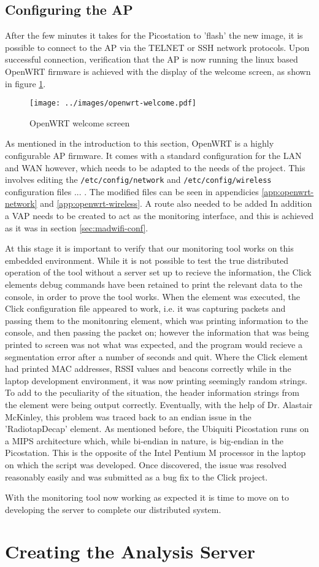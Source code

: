     \subsection{Configuring the AP}
	After the few minutes it takes for the Picostation to 'flash' the new image, it is possible to connect to the AP via the TELNET or SSH network protocols. Upon successful connection, verification that the AP is now running the linux based OpenWRT firmware is achieved with the display of the welcome screen, as shown in figure \ref{fig:openwrt-welcome}.

	\begin{figure}[ht]
	  \centering
	  \texttt{[image: ../images/openwrt-welcome.pdf]}
	  \caption{OpenWRT welcome screen}
	  \label{fig:openwrt-welcome}
	\end{figure}

	As mentioned in the introduction to this section, OpenWRT is a highly configurable AP firmware. It comes with a standard configuration for the LAN and WAN however, which needs to be adapted to the needs of the project. This involves editing the \texttt{/etc/config/network} and \texttt{/etc/config/wireless} configuration files ... . The modified files can be seen in appendicies \ref{app:openwrt-network} and \ref{app:openwrt-wireless}. A route also needed to be added  In addition a VAP needs to be created to act as the monitoring interface, and this is achieved as it was in section \ref{sec:madwifi-conf}.
    
	At this stage it is important to verify that our monitoring tool works on this embedded environment. While it is not possible to test the true distributed operation of the tool without a server set up to recieve the information, the Click elements debug commands have been retained to print the relevant data to the console, in order to prove the tool works. When the element was executed, the Click configuration file appeared to work, i.e. it was capturing packets and passing them to the monitonring element, which was printing information to the console, and then passing the packet on; however the information that was being printed to screen was not what was expected, and the program would recieve a segmentation error after a number of seconds and quit. Where the Click element had printed MAC addresses, RSSI values and beacons correctly while in the laptop development environment, it was now printing seemingly random strings. To add to the peculiarity of the situation, the header information strings from the element were being output correctly. Eventually, with the help of Dr. Alastair McKinley, this problem was traced back to an endian issue in the 'RadiotapDecap' element. As mentioned before, the Ubiquiti Picostation runs on a MIPS architecture which, while bi-endian in nature, is big-endian in the Picostation. This is the opposite of the Intel Pentium M processor in the laptop on which the script was developed. Once discovered, the issue was resolved reasonably easily and was submitted as a bug fix to the Click project\cite{AM}.

	\bigskip
	\noindent With the monitoring tool now working as expected it is time to move on to developing the server to complete our distributed system.

  \section{Creating the Analysis Server}


 